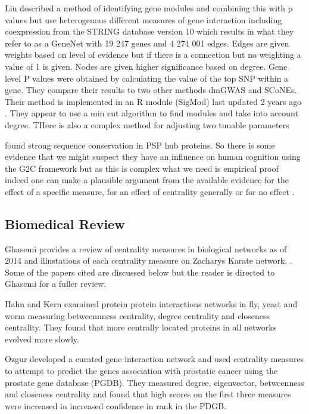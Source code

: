 Liu \cite{liu2017sigmod} described a method of identifying gene modules and combining this with p values but use heterogenous different measures of gene interaction including coexpression from the STRING database version 10 which results in what they refer to as a GeneNet  with 19 247 genes and 4 274 001 edges. Edges are given weights based on level of evidence but if there is a connection but no weighting a value of 1 is given. Nodes are given higher significance based on degree.  Gene level P values were obtained by calculating the value of the top SNP within a gene. They compare their results to two other methods dmGWAS and SCoNEs. Their method is implemented in an R module (SigMod) last updated 2 years ago . They appear to use a min cut algorithm to find modules and take into account degree. THere is also a complex method for adjusting two tunable parameters 



\cite{bayes2011characterization} found strong sequence conservation in PSP hub proteins. So there is some evidence that we might suspect they have an influence on human cognition using the G2C framework but as this is complex what we need is empirical proof indeed one can make a plausible argument from the available evidence for the effect of a specific measure, for an effect of centrality generally or for no effect .  


\subsection{ Biomedical Review}
Ghasemi provides a review of centrality measures in biological networks as of 2014 and illustations of each centrality measure on Zacharys Karate network.
\cite{ghasemi2014centrality}. Some of the papers cited are discussed below but the reader is directed to Ghasemi \cite{ghasemi2014centrality} for a fuller review. 

Hahn and Kern\cite{hahn2005comparative} examined protein protein interactions networks in fly, yeast and worm measuring betweennness centrality, degree centrality and closeness centrality. They found that more centrally located proteins in all networks evolved more slowly. 

Ozgur \cite{ozgur2008identifying} developed a curated gene interaction network and used centrality measures to attempt to predict the genes association with prostatic cancer using the prostate gene database (PGDB). They measured degree, eigenvector, betweenness and closeness centrality and found that high scores on the first three measures were increased in increased confidence in rank in the PDGB.

